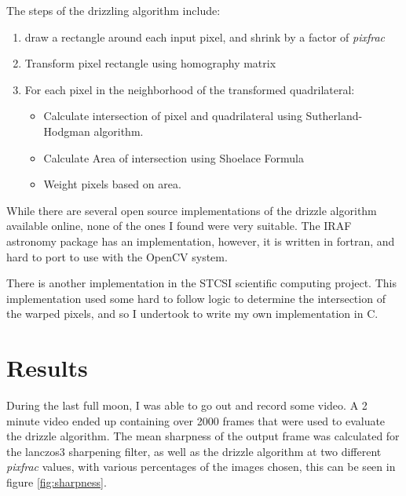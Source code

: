 \documentclass[conference]{IEEEtran}
\begin{document}
The steps of the drizzling algorithm include:

\begin{enumerate}
\item draw a rectangle around each input pixel, and shrink by a factor
  of \textit{pixfrac}
\item Transform pixel rectangle using homography matrix
\item For each pixel in the neighborhood of the transformed quadrilateral:

  \begin{itemize}
    \item Calculate intersection of pixel and quadrilateral using
      Sutherland-Hodgman\cite{Sutherland:1974:RPC:360767.360802}
      algorithm.

    \item Calculate Area of intersection using Shoelace
      Formula\cite{meister1769generalia}

      \item Weight pixels based on area. 
  \end{itemize}
\end{enumerate}

While there are several open source implementations of the drizzle
algorithm available online, none of the ones I found were very
suitable. The IRAF\cite{tody1993iraf} astronomy package has an
implementation, however, it is written in fortran, and hard to port to
use with the OpenCV system.

There is another implementation in the STCSI\cite{betadrizzle}
scientific computing project. This implementation used some hard to
follow logic to determine the intersection of the warped pixels, and
so I undertook to write my own implementation in C.

\section{Results}
During the last full moon, I was able to go out and record some
video. A 2 minute video ended up containing over 2000 frames that were
used to evaluate the drizzle algorithm. The mean sharpness of the
output frame was calculated for the lanczos3 sharpening filter, as
well as the drizzle algorithm at two different \textit{pixfrac}
values, with various percentages of the images chosen, this can be seen in figure \ref{fig:sharpness}. 
\end{document}
